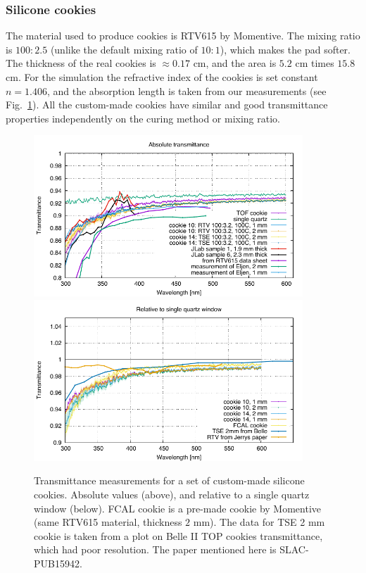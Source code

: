 \documentclass[11pt, a4paper]{article}
\begin{document}
\subsubsection*{Silicone cookies}

The material used to produce cookies is RTV615 by Momentive. The mixing ratio is $100 : 2.5$ (unlike the default mixing ratio of $10 : 1$), which makes the pad softer. The thickness of the real cookies is $\approx 0.17$ cm, and the area is $5.2$ cm times $15.8$ cm. For the simulation the refractive index of the cookies is set constant $n = 1.406$, and the absorption length is taken from our measurements (see Fig.~\ref{pic:coo}). All the custom-made cookies have similar and good transmittance properties independently on the curing method or mixing ratio.

\begin{figure}[!tb]
\centering
\includegraphics[angle=0,width=0.9\textwidth]{pics/transmittance1.pdf} \\
\includegraphics[angle=0,width=0.9\textwidth]{pics/cookie10_relQuartz.pdf}
\caption{\label{pic:coo}
Transmittance measurements for a set of custom-made silicone cookies. Absolute values (above), and relative to a single quartz window  (below). FCAL cookie is a pre-made cookie by Momentive (same RTV615 material, thickness $2$ mm). The data for TSE 2 mm cookie is taken from a plot on Belle II TOP cookies transmittance, which had poor resolution. The paper mentioned here is SLAC-PUB15942.
}
\end{figure}
\end{document}
